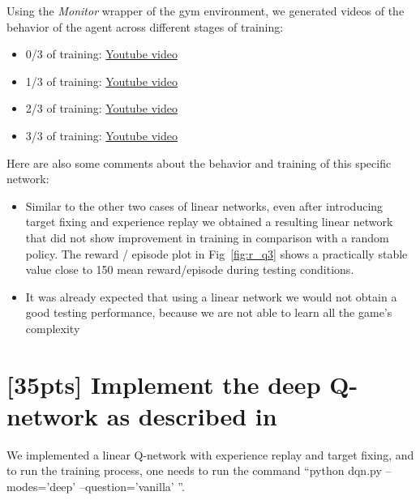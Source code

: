 \documentclass{article}
\begin{document}
Using the \textit{Monitor} wrapper of the gym environment, we generated videos of the behavior of the agent across different stages of training:

\begin{itemize}
  \item 0/3 of training: \href{https://youtu.be/dXuBxXwdYLI}{Youtube video}
  \item 1/3 of training: \href{https://youtu.be/TShwk_6CKaQ}{Youtube video}
  \item 2/3 of training: \href{https://youtu.be/Ii8oEaGhTCs}{Youtube video}
  \item 3/3 of training: \href{https://youtu.be/7BcIHBRCN1I}{Youtube video}
\end{itemize}

Here are also some comments about the behavior and training of this specific network:

\begin{itemize}
  \item Similar to the other two cases of linear networks, even after introducing target fixing and experience replay we obtained a resulting linear network that did not show improvement in training in comparison with a random policy. The reward / episode plot in Fig~\ref{fig:r_q3} shows a practically stable value close to 150 mean reward/episode during testing conditions.
  \item It was already expected that using a linear network we would not obtain a good testing performance, because we are not able to learn all the game's complexity
\end{itemize}

\section{[35pts] Implement the deep Q-network as described in \cite{mnih2013playing,mnih2015human}}

We implemented a linear Q-network with experience replay and target fixing, and to run the training process, one needs to run the command ``python dqn.py --modes='deep' --question='vanilla' ''.
\end{document}
